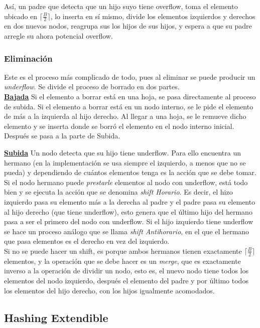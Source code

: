 \documentclass[12pt,letterpaper]{report}
\begin{document}
Así, un padre que detecta que un hijo suyo tiene overflow, toma el elemento ubicado en $\lceil \frac{B}{2}\rceil$, lo inserta en sí mismo, divide los elementos izquierdos y derechos en dos nuevos nodos, reagrupa sus los hijos de sus hijos, y espera a que su padre arregle su ahora potencial overflow.

\subsubsection{Eliminación}
Este es el proceso más complicado de todo, pues al eliminar se puede producir un \emph{underflow}. Se divide el proceso de borrado en dos partes.\\

\textbf{\underline{Bajada}} Si el elemento a borrar está en una hoja, se pasa directamente al proceso de subida. Si el elemento a borrar está en un nodo interno, se le pide el elemento de más a la izquierda al hijo derecho. Al llegar a una hoja, se le remueve dicho elemento y se inserta donde se borró el elemento en el nodo interno inicial. Después se pasa a la parte de Subida.

\textbf{\underline{Subida}} Un nodo detecta que su hijo tiene underflow. Para ello encuentra un hermano (en la implementación se usa siempre el izquierdo, a menos que no se pueda) y dependiendo de cuántos elementos tenga es la acción que se debe tomar. Si el nodo hermano puede \emph{prestarle} elementos al nodo con underflow, está todo bien y se ejecuta la acción que se denomina \emph{shift Horario}. Es decir, el hizo izquierdo pasa su elemento más a la derecha al padre y el padre pasa su elemento al hijo derecho (que tiene underflow), esto genera que el último hijo del hermano pasa a ser el primero del nodo con underflow. Si el hijo izquierdo tiene underflow se hace un proceso análogo que se llama \emph{shift Antihorario}, en el que el hermano que pasa elementos es el derecho en vez del izquierdo.\\

Si no se puede hacer un shift, es porque ambos hermanos tienen exactamente $\lceil \frac{B}{2}\rceil$ elementos, y la operación que se debe hacer es un \emph{merge}, que es exactamente inverso a la operación de dividir un nodo, esto es, el nuevo nodo tiene todos los elementos del nodo izquierdo, después el elemento del padre y por último todos los elementos del hijo derecho, con los hijos igualmente acomodados.


\subsection{Hashing Extendible}
\end{document}
